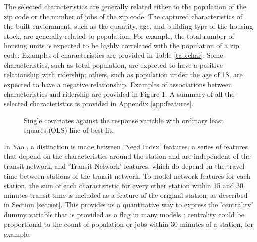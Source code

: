 \documentclass[11pt]{article}
\begin{document}
The selected characteristics are generally related either to the population of the zip code or the number of jobs of the zip code. The captured characteristics of the built enviornment, such as the quantity, age, and building type of the housing stock, are generally related to population. For example, the total number of housing units is expected to be highly correlated with the population of a zip code.  Examples of characteristics are provided in Table \ref{tab:char}. Some characteristics, such as total population, are expected to have a positive relationship with ridership; others, such as population under the age of 18, are expected to have a negative relationship. Examples of associations between characteristics and ridership are provided in Figure \ref{fig:chartypes}. A summary of all the selected characteristics is provided in Appendix \ref{app:features}.



\begin{figure}[H]
\centering
{}
\caption{Single covariates against the response variable with ordinary least squares (OLS) line of best fit.}\label{fig:chartypes}
\end{figure}


In Yao \cite{Yao2007}, a distinction is made between `Need Index' features, a series of features that depend on the characteristics around the station and are independent of the transit network, and `Transit Network' features, which do depend on the travel time between stations of the transit network. To model network features for each station, the sum of each characteristic for every other station within 15 and 30 minutes transit time is included as a feature of the original station, as described in Section \ref{sec:net}. This provides us a quantitative way to express the 'centrality' dummy variable that is provided as a flag in many models \cite{Kuby2004, Durning2015}; centrality could be proportional to the count of population or jobs within 30 minutes of a station, for example. 
\end{document}
